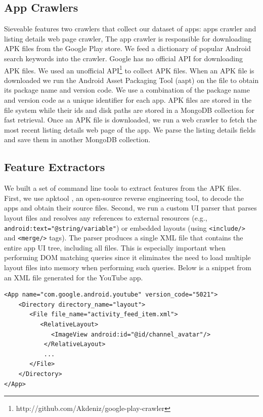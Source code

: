 \subsection{App Crawlers}
Sieveable features two crawlers that collect our dataset of apps: apps crawler and listing details web page crawler,
The app crawler is responsible for downloading APK files from the Google Play store.
We feed a dictionary of popular Android search keywords into the crawler.
Google has no official API for downloading APK files.
We used an unofficial API\footnote{http://github.com/Akdeniz/google-play-crawler} to collect APK files.
When an APK file is downloaded we run the Android Asset Packaging Tool (aapt) on the file to obtain its package name and version code.
We use a combination of the package name and version code as a unique identifier for each app.
APK files are stored in the file system while their ids and disk paths are stored in a MongoDB collection for fast retrieval.
Once an APK file is downloaded, we run a web crawler to fetch the most recent listing details web page of the app.
We parse the listing details fields and save them in another MongoDB collection.

\subsection{Feature Extractors}
We built a set of command line tools to extract features from the APK files.
First, we use apktool \cite{apktool}, an open-source reverse engineering tool, to decode the apps and obtain their source files.
Second, we run a custom UI parser that parses layout files and resolves any references to external resources (e.g., \texttt{android:text="@string/variable"}) or embedded layouts (using \texttt{<include/>} and \texttt{<merge/>} tags).
The parser produces a single XML file that contains the entire app UI tree, including all files.
This is especially important when performing DOM matching queries since it eliminates the need to load multiple layout files into memory when performing such queries.
Below is a snippet from an XML file generated for the YouTube app.

\begin{verbatim}
<App name="com.google.android.youtube" version_code="5021">
    <Directory directory_name="layout">
       <File file_name="activity_feed_item.xml">
          <RelativeLayout>
             <ImageView android:id="@id/channel_avatar"/>
           </RelativeLayout>
           ...
       </File>
    </Directory>
</App>
\end{verbatim}

